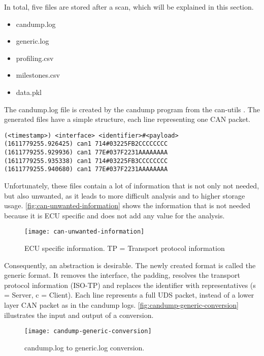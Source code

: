 In total, five files are stored after a scan, which will be explained in this section.

\begin{itemize}
    \item candump.log
    \item generic.log
    \item profiling.csv
    \item milestones.csv
    \item data.pkl
\end{itemize}

The candump.log file is created by the candump program from the can-utils \cite{can-utils}. The generated files have a simple structure, each line representing one CAN packet.

\begin{samepage}
\begin{verbatim}
(<timestamp>) <interface> <identifier>#<payload>
(1611779255.926425) can1 714#03225FB2CCCCCCCC
(1611779255.929936) can1 77E#037F2231AAAAAAAA
(1611779255.935338) can1 714#03225FB3CCCCCCCC
(1611779255.940680) can1 77E#037F2231AAAAAAAA
\end{verbatim}
\end{samepage}

Unfortunately, these files contain a lot of information that is not only not needed, but also unwanted, as it leads to more difficult analysis and to higher storage usage. \autoref{fig:can-unwanted-information} shows the information that is not needed because it is ECU specific and does not add any value for the analysis.

\begin{figure}[h]
    \centering
    \texttt{[image: can-unwanted-information]}
    \caption{ECU specific information. TP = Transport protocol information}
    \label{fig:can-unwanted-information}
\end{figure}

Consequently, an abstraction is desirable. The newly created format is called the generic format. It removes the interface, the padding, resolves the transport protocol information (ISO-TP) and replaces the identifier with representatives (s = Server, c = Client). Each line represents a full UDS packet, instead of a lower layer CAN packet as in the candump logs. \autoref{fig:candump-generic-conversion} illustrates the input and output of a conversion.

\begin{figure}[h]
    \centering
    \texttt{[image: candump-generic-conversion]}
    \caption{candump.log to generic.log conversion.}
    \label{fig:candump-generic-conversion}
\end{figure}

